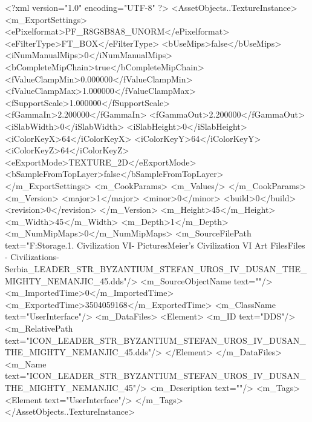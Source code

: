 <?xml version="1.0" encoding="UTF-8" ?>
<AssetObjects..TextureInstance>
	<m_ExportSettings>
		<ePixelformat>PF_R8G8B8A8_UNORM</ePixelformat>
		<eFilterType>FT_BOX</eFilterType>
		<bUseMips>false</bUseMips>
		<iNumManualMips>0</iNumManualMips>
		<bCompleteMipChain>true</bCompleteMipChain>
		<fValueClampMin>0.000000</fValueClampMin>
		<fValueClampMax>1.000000</fValueClampMax>
		<fSupportScale>1.000000</fSupportScale>
		<fGammaIn>2.200000</fGammaIn>
		<fGammaOut>2.200000</fGammaOut>
		<iSlabWidth>0</iSlabWidth>
		<iSlabHeight>0</iSlabHeight>
		<iColorKeyX>64</iColorKeyX>
		<iColorKeyY>64</iColorKeyY>
		<iColorKeyZ>64</iColorKeyZ>
		<eExportMode>TEXTURE_2D</eExportMode>
		<bSampleFromTopLayer>false</bSampleFromTopLayer>
	</m_ExportSettings>
	<m_CookParams>
		<m_Values/>
	</m_CookParams>
	<m_Version>
		<major>1</major>
		<minor>0</minor>
		<build>0</build>
		<revision>0</revision>
	</m_Version>
	<m_Height>45</m_Height>
	<m_Width>45</m_Width>
	<m_Depth>1</m_Depth>
	<m_NumMipMaps>0</m_NumMipMaps>
	<m_SourceFilePath text="F:\Mod Storage\2.1. Civilization VI\Mods\Archive - Pictures\Sid Meier's Civilization VI Art Files\Art Files - Civilizations\Civilization - Serbia\ICON_LEADER_STR_BYZANTIUM_STEFAN_UROS_IV_DUSAN_THE_MIGHTY_NEMANJIC_45.dds"/>
	<m_SourceObjectName text=""/>
	<m_ImportedTime>0</m_ImportedTime>
	<m_ExportedTime>3504059168</m_ExportedTime>
	<m_ClassName text="UserInterface"/>
	<m_DataFiles>
		<Element>
			<m_ID text="DDS"/>
			<m_RelativePath text="ICON_LEADER_STR_BYZANTIUM_STEFAN_UROS_IV_DUSAN_THE_MIGHTY_NEMANJIC_45.dds"/>
		</Element>
	</m_DataFiles>
	<m_Name text="ICON_LEADER_STR_BYZANTIUM_STEFAN_UROS_IV_DUSAN_THE_MIGHTY_NEMANJIC_45"/>
	<m_Description text=""/>
	<m_Tags>
		<Element text="UserInterface"/>
	</m_Tags>
</AssetObjects..TextureInstance>


